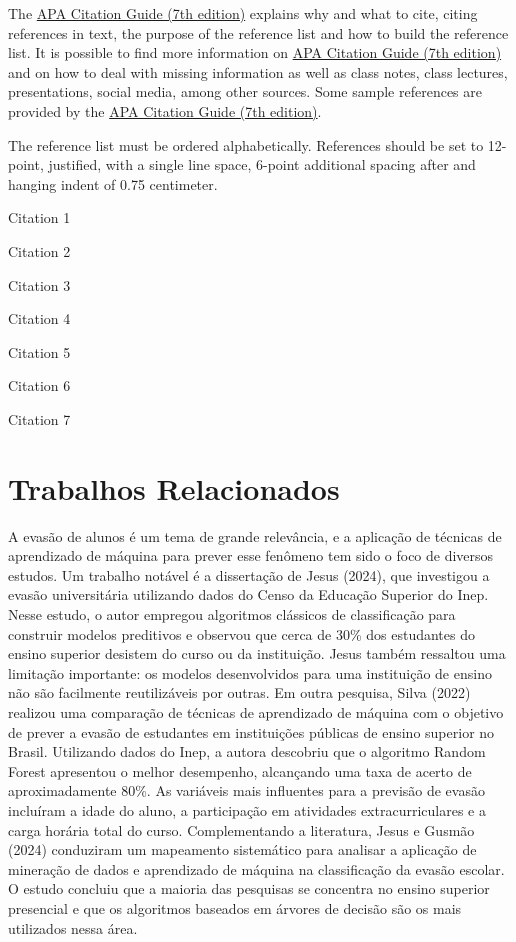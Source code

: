 \documentclass[english, spanish, brazilian]{RBIEarticle} %
\begin{document}
    The  \href{https://libguides.brenau.edu/APA7}{APA Citation Guide (7th edition)} explains why and what to cite, citing references in text, the purpose of the reference list and how to build the reference list. It is possible to find more information on  \href{https://libguides.brenau.edu/APA7}{APA Citation Guide (7th edition)} and on how to deal with missing information as well as class notes, class lectures, presentations, social media, among other sources. Some sample references are provided by the  \href{https://libguides.brenau.edu/APA7}{APA Citation Guide (7th edition)}.
    
    The reference list must be ordered alphabetically. References should be set to 12-point, justified, with a single line space, 6-point additional spacing after and hanging indent of 0.75 centimeter.
    
    Citation 1 \parencite{Baker2011}
    
    Citation 2 \parencite{Seffrin2013}
    
    Citation 3 \parencite{Brasil2008}
    
    Citation 4 \parencite{Kautzman2015}
    
    Citation 5 \parencite{Sweller1991}
    
    Citation 6 \parencite{Clark2006}
    
    Citation 7 \parencite{Mason2012}
\fi %

\section{Trabalhos Relacionados}
A evasão de alunos é um tema de grande relevância, e a aplicação de técnicas de aprendizado de máquina para prever esse fenômeno tem sido o foco de diversos estudos. Um trabalho notável é a dissertação de Jesus (2024), que investigou a evasão universitária utilizando dados do Censo da Educação Superior do Inep. Nesse estudo, o autor empregou algoritmos clássicos de classificação para construir modelos preditivos e observou que cerca de 30\% dos estudantes do ensino superior desistem do curso ou da instituição. Jesus também ressaltou uma limitação importante: os modelos desenvolvidos para uma instituição de ensino não são facilmente reutilizáveis por outras.
Em outra pesquisa, Silva (2022) realizou uma comparação de técnicas de aprendizado de máquina com o objetivo de prever a evasão de estudantes em instituições públicas de ensino superior no Brasil. Utilizando dados do Inep, a autora descobriu que o algoritmo Random Forest apresentou o melhor desempenho, alcançando uma taxa de acerto de aproximadamente 80\%. As variáveis mais influentes para a previsão de evasão incluíram a idade do aluno, a participação em atividades extracurriculares e a carga horária total do curso.
Complementando a literatura, Jesus e Gusmão (2024) conduziram um mapeamento sistemático para analisar a aplicação de mineração de dados e aprendizado de máquina na classificação da evasão escolar. O estudo concluiu que a maioria das pesquisas se concentra no ensino superior presencial e que os algoritmos baseados em árvores de decisão são os mais utilizados nessa área.
\end{document}
